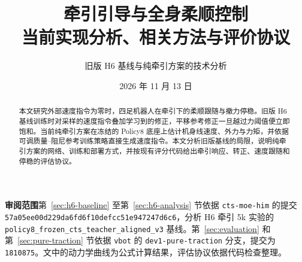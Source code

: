 \documentclass[UTF8,a4paper,11pt,fontset=fandol]{ctexart}
\title{\vspace{-12mm}\textbf{牵引引导与全身柔顺控制}\\[5pt]\Large 当前实现分析、相关方法与评价协议}
\author{旧版 H6 基线与纯牵引方案的技术分析}
\date{2026 年 11 月 13 日}
\newcommand{\code}[1]{\texttt{\nolinkurl{#1}}}
\begin{document}
\maketitle
\begin{abstract}
本文研究外部速度指令为零时，四足机器人在牵引下的柔顺跟随与撤力停稳。旧版 H6 基线训练时对采样的速度指令叠加学习到的修正，平移参考修正一旦越过力阈值便立即饱和。当前纯牵引方案在冻结的 Policy8 底座上估计机身线速度、外力与力矩，并依据可调质量--阻尼参考训练策略直接生成速度指令。本文分析旧版基线的局限，说明纯牵引方案的网络、训练和部署方式，并按现有评分代码给出牵引响应、转正、速度跟随和停稳的评估协议。
\end{abstract}
\noindent\textbf{审阅范围}\quad 第~\ref{sec:h6-baseline} 至第~\ref{sec:h6-analysis} 节依据 \code{cts-moe-him} 的提交
\code{57a05ee00d229da6fd6f10defcc51e947247d6c6}，分析 H6 牵引 5k 实验的 \code{policy8_frozen_cts_teacher_aligned_v3} 基线。第~\ref{sec:evaluation} 和第~\ref{sec:pure-traction} 节依据 \code{vbot} 的 \code{dev1-pure-traction} 分支，提交为 \code{1810875}。文中的动力学曲线为公式计算结果，评估协议依据代码检查整理。
\clearpage
\tableofcontents
\newpage









\clearpage




\clearpage
\appendix


\begingroup
\raggedright


\endgroup
\end{document}
